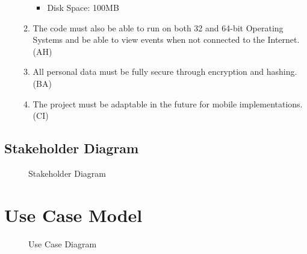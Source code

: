 \documentclass[a4paper]{article}
\begin{document}
\begin{enumerate}
\begin{enumerate}[label=NF\arabic*.]
\begin{itemize}
        \item Disk Space: 100MB
      \end{itemize}
      \item The code must also be able to run on both 32 and 64-bit Operating Systems and be able to view events when not connected to the Internet. (AH)
      \item All personal data must be fully secure through encryption and hashing. (BA)
      \item The project must be adaptable in the future for mobile implementations. (CI)
  \end{enumerate}
\end{enumerate}

\clearpage %
\subsection{Stakeholder Diagram}

\begin{figure}[!ht]
    \centering
    \caption{Stakeholder Diagram}
    \label{fig:stakeholder}
\end{figure}

\clearpage
\section{Use Case Model}
\begin{figure}[!ht] %
    \centering{} %
    \caption{Use Case Diagram}
    \label{fig:usecase}
\end{figure}
\end{document}
